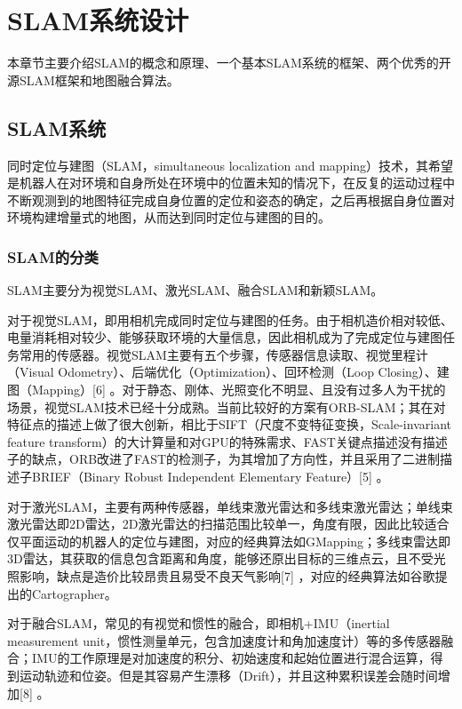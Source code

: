 \chapter{SLAM系统设计} \label{System Overview}
本章节主要介绍SLAM的概念和原理、一个基本SLAM系统的框架、两个优秀的开源SLAM框架和地图融合算法。

\section{SLAM系统}
同时定位与建图（SLAM，simultaneous localization and mapping）技术，其希望是机器人在对环境和自身所处在环境中的位置未知的情况下，在反复的运动过程中不断观测到的地图特征完成自身位置的定位和姿态的确定，之后再根据自身位置对环境构建增量式的地图，从而达到同时定位与建图的目的。


\subsection{SLAM的分类} \label{3.1.1}
SLAM主要分为视觉SLAM、激光SLAM、融合SLAM和新颖SLAM。


对于视觉SLAM，即用相机完成同时定位与建图的任务。由于相机造价相对较低、电量消耗相对较少、能够获取环境的大量信息，因此相机成为了完成定位与建图任务常用的传感器。视觉SLAM主要有五个步骤，传感器信息读取、视觉里程计（Visual Odometry）、后端优化（Optimization）、回环检测（Loop Closing）、建图（Mapping）[6] 。对于静态、刚体、光照变化不明显、且没有过多人为干扰的场景，视觉SLAM技术已经十分成熟。当前比较好的方案有ORB-SLAM；其在对特征点的描述上做了很大创新，相比于SIFT（尺度不变特征变换，Scale-invariant feature transform）的大计算量和对GPU的特殊需求、FAST关键点描述没有描述子的缺点，ORB改进了FAST的检测子，为其增加了方向性，并且采用了二进制描述子BRIEF（Binary Robust Independent Elementary Feature）[5] 。


对于激光SLAM，主要有两种传感器，单线束激光雷达和多线束激光雷达；单线束激光雷达即2D雷达，2D激光雷达的扫描范围比较单一，角度有限，因此比较适合仅平面运动的机器人的定位与建图，对应的经典算法如GMapping；多线束雷达即3D雷达，其获取的信息包含距离和角度，能够还原出目标的三维点云，且不受光照影响，缺点是造价比较昂贵且易受不良天气影响[7] ，对应的经典算法如谷歌提出的Cartographer。


对于融合SLAM，常见的有视觉和惯性的融合，即相机+IMU（inertial measurement unit，惯性测量单元，包含加速度计和角加速度计）等的多传感器融合；IMU的工作原理是对加速度的积分、初始速度和起始位置进行混合运算，得到运动轨迹和位姿。但是其容易产生漂移（Drift），并且这种累积误差会随时间增加[8] 。


